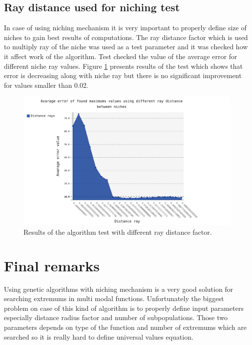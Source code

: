 \documentclass[a4paper]{article}
\begin{document}
\subsection{Ray distance used for niching test}
In case of using niching mechanism it is very important to properly define size of niches to gain best results of computations. 
The ray distance factor which is used to multiply ray of the niche was used as a test parameter and it was checked how it affect work of the algorithm. 
Test checked the value of the average error for different niche ray values. Figure \ref{ray} presents results of the test which shows that error 
is decreasing along with niche ray but there is no significant improvement for values smaller than 0.02.
\vfill
\begin{figure}[ht]
	\centering
	
	\includegraphics[scale=0.36,keepaspectratio=true]{distance.png}	
	\caption{Results of the algorithm test with different ray distance factor.}
	\label{ray}
	
\end{figure}
\vfill
\clearpage

\section{Final remarks}
Using genetic algorithms with niching mechanism is a very good solution for searching extremums in multi modal functions. Unfortunately the biggest problem on case of this kind 
of algorithm is to properly define input parameters especially distance radius factor and number of subpopulations. Those two parameters depends on type of  the function and number of 
extremums which are searched so it is really hard to define universal values equation. 
\newpage
\listoffigures


\end{document}
